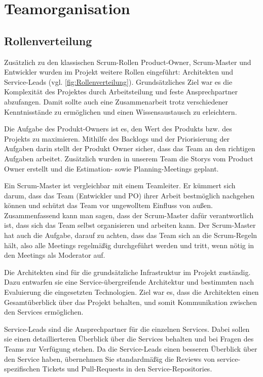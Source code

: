 
\chapter{Teamorganisation}

\section{Rollenverteilung}
    Zusätzlich zu den klassischen Scrum-Rollen Product-Owner, Scrum-Master und Entwickler 
    wurden im Projekt weitere Rollen eingeführt: Architekten und Service-Leads (vgl. \ref*{fig:Rollenverteilung}). 
    Grundsätzliches Ziel war es die Komplexität des Projektes durch Arbeitsteilung und feste Ansprechpartner abzufangen.
    Damit sollte auch eine Zusammenarbeit trotz verschiedener Kenntnisstände zu ermöglichen und einen Wissensaustausch zu erleichtern.   

    Die Aufgabe des Produkt-Owners ist es, den Wert des Produkts bzw. des Projekts
    zu maximieren. Mithilfe des Backlogs und der Priorisierung der Aufgaben darin stellt der Produkt Owner
    sicher, dass das Team an den richtigen Aufgaben arbeitet.
    Zusätzlich wurden in unserem Team die Storys vom Product Owner erstellt und die Estimation- sowie Planning-Meetings geplant.

    Ein Scrum-Master ist vergleichbar mit einem Teamleiter. Er kümmert sich darum, dass
    das Team (Entwickler und PO) ihrer Arbeit bestmöglich nachgehen können und schützt
    das Team vor ungewolltem Einfluss von außen. Zusammenfassend kann
    man sagen, dass der Scrum-Master dafür verantwortlich ist, dass sich das Team selbst
    organisieren und arbeiten kann. Der Scrum-Master hat auch die Aufgabe, darauf zu achten, dass das Team sich an die
    Scrum-Regeln hält, also alle Meetings regelmäßig durchgeführt werden und tritt, wenn nötig in den Meetings als Moderator auf.

    Die Architekten sind für die grundsätzliche Infrastruktur im Projekt zuständig. 
    Dazu entwarfen sie eine Service-übergreifende Architektur und bestimmten nach Evaluierung die eingesetzten Technologien.
    Ziel war es, dass die Architekten einen Gesamtüberblick über das Projekt behalten, 
    und somit Kommunikation zwischen den Services ermöglichen.
     
    
    Service-Leads sind die Ansprechpartner für die einzelnen Services. Dabei sollen sie einen detaillierteren Überblick über die Services behalten 
    und bei Fragen des Teams zur Verfügung stehen. 
    Da die Service-Leads einen besseren Überblick über den Service haben, 
    übernehmen Sie standardmäßig die Reviews von service-spezifischen Tickets und Pull-Requests in den Service-Repositories.

